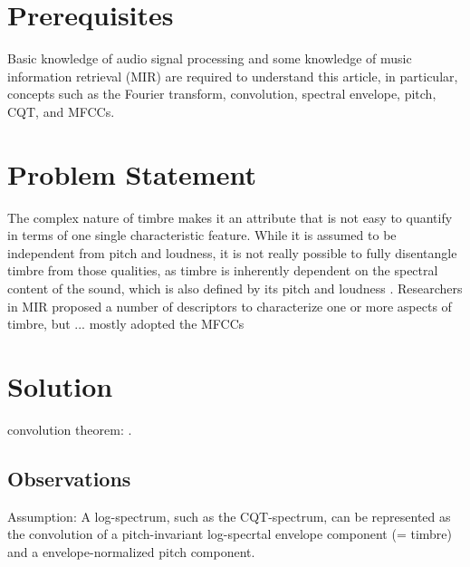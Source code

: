 \documentclass[journal]{IEEEtran}
\begin{document}
\section{Prerequisites}

Basic knowledge of audio signal processing and some knowledge of music information retrieval (MIR) are required to understand this article, in particular, concepts such as the Fourier transform, convolution, spectral envelope, pitch, CQT, and MFCCs.


\section{Problem Statement}

The complex nature of timbre makes it an attribute that is not easy to quantify in terms of one single characteristic feature. While it is assumed to be independent from pitch and loudness, it is not really possible to fully disentangle timbre from those qualities, as timbre is inherently dependent on the spectral content of the sound, which is also defined by its pitch and loudness \cite{moore2004}. Researchers in MIR proposed a number of descriptors to characterize one or more aspects of timbre, but ... mostly adopted the MFCCs




\section{Solution}


convolution theorem: \cite{proakis1995}.

\subsection{Observations}

Assumption: A log-spectrum, such as the CQT-spectrum, can be represented as the convolution of a pitch-invariant log-specrtal envelope component (= timbre) and a envelope-normalized pitch component.
\end{document}
